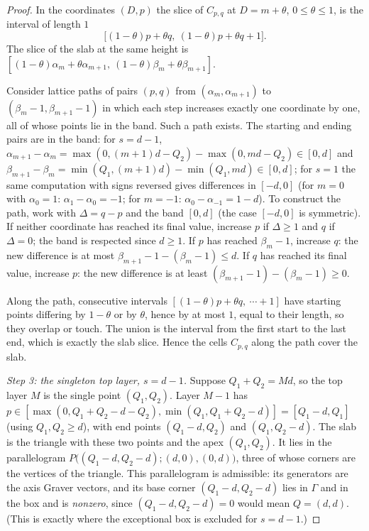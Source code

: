 \begin{proof}
In the coordinates $(D,p)$ the slice of $C_{p,q}$ at $D=m+\theta$, $0\le\theta\le1$, is the interval of length $1$
\[
  \bigl[(1-\theta)p+\theta q,\ (1-\theta)p+\theta q+1\bigr].
\]
The slice of the slab at the same height is $[(1-\theta)\alpha_m+\theta\alpha_{m+1},\ (1-\theta)\beta_m+\theta\beta_{m+1}]$.

Consider lattice paths of pairs $(p,q)$ from $(\alpha_m,\alpha_{m+1})$ to $(\beta_m-1,\beta_{m+1}-1)$ in which each step increases exactly one coordinate by one, all of whose points lie in the band. Such a path exists. The starting and ending pairs are in the band: for $s=d-1$, $\alpha_{m+1}-\alpha_m=\max(0,(m+1)d-Q_2)-\max(0,md-Q_2)\in[0,d]$ and $\beta_{m+1}-\beta_m=\min(Q_1,(m+1)d)-\min(Q_1,md)\in[0,d]$; for $s=1$ the same computation with signs reversed gives differences in $[-d,0]$ (for $m=0$ with $\alpha_0=1$: $\alpha_1-\alpha_0=-1$; for $m=-1$: $\alpha_0-\alpha_{-1}=1-d$). To construct the path, work with $\Delta=q-p$ and the band $[0,d]$ (the case $[-d,0]$ is symmetric). If neither coordinate has reached its final value, increase $p$ if $\Delta\ge1$ and $q$ if $\Delta=0$; the band is respected since $d\ge1$. If $p$ has reached $\beta_m-1$, increase $q$: the new difference is at most $\beta_{m+1}-1-(\beta_m-1)\le d$. If $q$ has reached its final value, increase $p$: the new difference is at least $(\beta_{m+1}-1)-(\beta_m-1)\ge0$.

Along the path, consecutive intervals $[(1-\theta)p+\theta q,\ \cdots+1]$ have starting points differing by $1-\theta$ or by $\theta$, hence by at most $1$, equal to their length, so they overlap or touch. The union is the interval from the first start to the last end, which is exactly the slab slice. Hence the cells $C_{p,q}$ along the path cover the slab.

\emph{Step 3: the singleton top layer, $s=d-1$.} Suppose $Q_1+Q_2=Md$, so the top layer $M$ is the single point $(Q_1,Q_2)$. Layer $M-1$ has $p\in[\max(0,Q_1+Q_2-d-Q_2),\min(Q_1,Q_1+Q_2-d)]=[Q_1-d,Q_1]$ (using $Q_1,Q_2\ge d$), with end points $(Q_1-d,Q_2)$ and $(Q_1,Q_2-d)$. The slab is the triangle with these two points and the apex $(Q_1,Q_2)$. It lies in the parallelogram $P\bigl((Q_1-d,Q_2-d);(d,0),(0,d)\bigr)$, three of whose corners are the vertices of the triangle. This parallelogram is admissible: its generators are the axis Graver vectors, and its base corner $(Q_1-d,Q_2-d)$ lies in $\Gamma$ and in the box and is \emph{nonzero}, since $(Q_1-d,Q_2-d)=0$ would mean $Q=(d,d)$. (This is exactly where the exceptional box is excluded for $s=d-1$.)


\end{proof}
